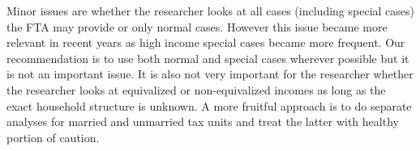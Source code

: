 \documentclass[twoside]{article}\usepackage[]{graphicx}\usepackage[]{color}
\begin{document}
\begin{multicols}{2}
Minor issues are whether the researcher looks at all cases (including special cases) the FTA may provide or only normal cases. However this issue became more relevant in recent years as high income special cases became more frequent. Our recommendation is to use both normal and special cases wherever possible but it is not an important issue. It is also not very important for the researcher whether the researcher looks at equivalized or non-equivalized incomes as long as the exact household structure is unknown. A more fruitful approach is to do separate analyses for married and unmarried tax units and treat the latter with healthy portion of caution.






\end{multicols}
\end{document}
